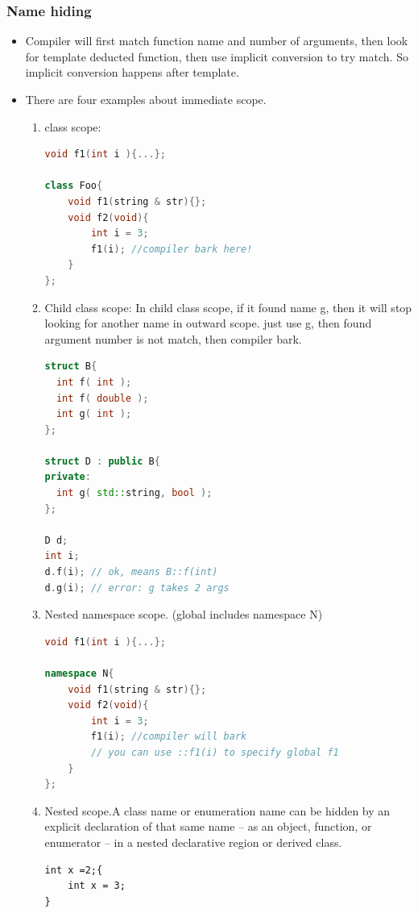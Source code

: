 \documentclass[a4paper,12pt,twoside]{book}
\begin{document}
\subsubsection{Name hiding}
\begin{itemize}

\item Compiler will first match function name and number of arguments, then look for template deducted function, then use implicit conversion to try match. So implicit conversion happens after template.

\item There are four examples about immediate scope.
\begin{enumerate}
\item class scope:
\begin{lstlisting}[frame=single, language=c++]
void f1(int i ){...};

class Foo{
	void f1(string & str){};
	void f2(void){
		int i = 3;
		f1(i); //compiler bark here!
	}
};
\end{lstlisting}

\item Child class scope: In child class scope, if it found name g, then it will stop looking for another name in outward scope. just use g, then found argument number is not match, then compiler bark.
\begin{lstlisting}[frame=single, language=c++]
struct B{
  int f( int );
  int f( double );
  int g( int );
};

struct D : public B{
private:
  int g( std::string, bool );
};

D d;
int i;
d.f(i); // ok, means B::f(int)
d.g(i); // error: g takes 2 args
\end{lstlisting}

\item Nested namespace scope. (global includes namespace N)
\begin{lstlisting}[frame=single, language=c++]
void f1(int i ){...};

namespace N{
	void f1(string & str){};
	void f2(void){
		int i = 3;
		f1(i); //compiler will bark
		// you can use ::f1(i) to specify global f1
	}
};
\end{lstlisting}
\item Nested scope.A class name or enumeration name can be hidden by an explicit declaration of that same name -- as an object, function, or enumerator -- in a nested declarative region or derived class.
\begin{lstlisting}
int x =2;{
	int x = 3;
}
\end{lstlisting}


\end{enumerate}
\end{itemize}
\end{document}
